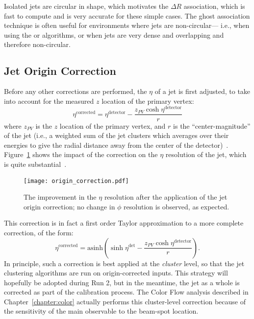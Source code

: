 Isolated \antikt jets are circular in shape, which motivates the $\Delta R$ association, which is fast to compute and is very accurate for these simple cases. The ghost association technique is often useful for environments where jets are non-circular--- i.e., when using the \kt or \ca algorithms, or when jets are very dense and overlapping and therefore non-circular.



\subsection{Jet Origin Correction}
\label{jet-reconstruction:origin}
Before any other corrections are performed, the $\eta$ of a jet is first adjusted, to take into account for the measured $z$ location of the primary vertex:
%
\begin{equation}
\eta^\mathrm{corrected} = \eta^\mathrm{detector} - \frac{z_{PV} \cosh \eta^\mathrm{detector} }{r}
\end{equation}
%
where $z_{PV}$ is the $z$ location of the primary vertex, and $r$ is the ``center-magnitude'' of the jet (i.e., a weighted sum of the jet clusters which averages over their energies to give the radial distance away from the center of the detector)~\cite{JES2011}. Figure~\ref{fig:jet-reconstruction:origin_correction} shows the impact of the correction on the $\eta$ resolution of the jet, which is quite substantial~\cite{Nachman:1728288}.


\begin{figure}
\centering
\texttt{[image: origin\_correction.pdf]}
\caption{The improvement in the $\eta$ resolution after the application of the jet origin correction; no change in $\phi$ resolution is observed, as expected.}
\label{fig:jet-reconstruction:origin_correction}
\end{figure}


This correction is in fact a first order Taylor approximation to a more complete correction, of the form:
%
\begin{equation}
\eta^\mathrm{corrected} = \mathrm{asinh} \left(\sinh \eta^\mathrm{det} - \frac{z_{PV} \cosh \eta^\mathrm{detector}}{r}  \right).
\end{equation}
%
In principle, such a correction is best applied at the \textit{cluster} level, so that the jet clustering algorithms are run on origin-corrected inputs. This strategy will hopefully be adopted during Run 2, but in the meantime, the jet as a whole is corrected as part of the calibration process. The Color Flow analysis described in Chapter~\ref{chapter:color} actually performs this cluster-level correction because of the sensitivity of the main observable to the beam-spot location.


